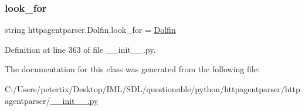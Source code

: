 \subsubsection{\texorpdfstring{look\+\_\+for}{look\_for}}
{\footnotesize\ttfamily string httpagentparser.\+Dolfin.\+look\+\_\+for = \textquotesingle{}\hyperlink{classhttpagentparser_1_1_dolfin}{Dolfin}\textquotesingle{}\hspace{0.3cm}{\ttfamily [static]}}



Definition at line 363 of file \+\_\+\+\_\+init\+\_\+\+\_\+.\+py.



The documentation for this class was generated from the following file\+:\begin{DoxyCompactItemize}
\item 
C\+:/\+Users/petertix/\+Desktop/\+I\+M\+L/\+S\+D\+L/questionable/python/httpagentparser/httpagentparser/\hyperlink{____init_____8py}{\+\_\+\+\_\+init\+\_\+\+\_\+.\+py}\end{DoxyCompactItemize}
